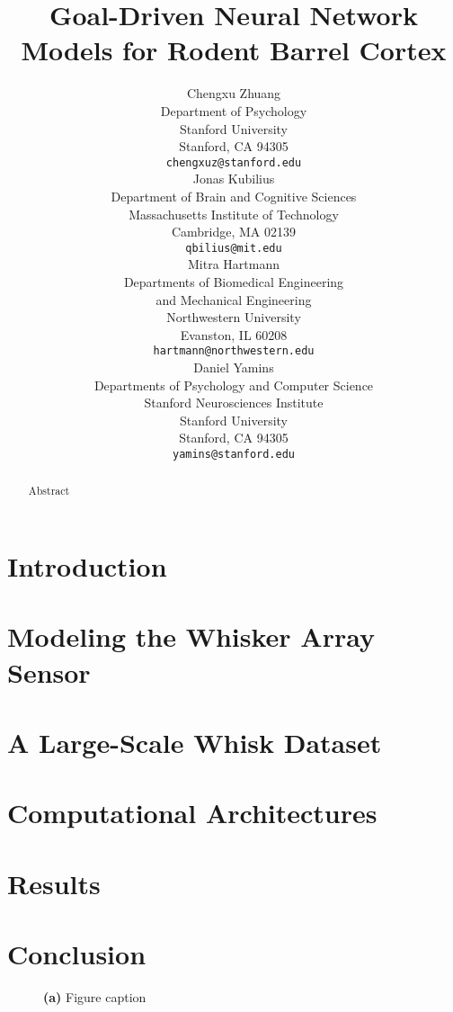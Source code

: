 \documentclass{article} %
\title{Goal-Driven Neural Network Models for Rodent Barrel Cortex}
\author{
Chengxu Zhuang\\
Department of Psychology\\
Stanford University\\
Stanford, CA 94305 \\
\texttt{chengxuz@stanford.edu} \\
\And
Jonas Kubilius \\
Department of Brain and Cognitive Sciences \\
Massachusetts Institute of Technology \\
Cambridge, MA  02139\\
\texttt{qbilius@mit.edu} \\
\And
Mitra Hartmann \\
Departments of Biomedical Engineering \\
and Mechanical Engineering \\
Northwestern University \\
Evanston, IL  60208\\
\texttt{hartmann@northwestern.edu} \\
\And
Daniel Yamins \\
Departments of Psychology and Computer Science \\
Stanford Neurosciences Institute \\
Stanford University \\
Stanford, CA 94305 \\
\texttt{yamins@stanford.edu} \\
}
\begin{document}
\maketitle

\begin{abstract}
Abstract
\end{abstract}


\section{Introduction} %


\section{Modeling the Whisker Array Sensor} %


\section{A Large-Scale Whisk Dataset} %


\section{Computational Architectures} %


\section{Results} %


\section{Conclusion}  %


\begin{figure}[h]
\centering
\vspace{-2mm}
\caption{\textbf{(a)} Figure caption~\label{figname}}
\end{figure}


{\small
}

\end{document}
